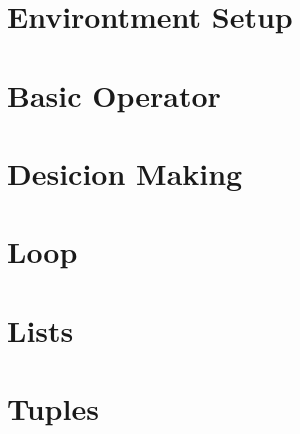 \documentclass{wileySix}
\begin{document}
\chapter{Environtment Setup}
%


%

%

\chapter{Basic Operator}


\chapter{Desicion Making}


\chapter{Loop}


%

%

\chapter{Lists}


\chapter{Tuples}


%
\end{document}
